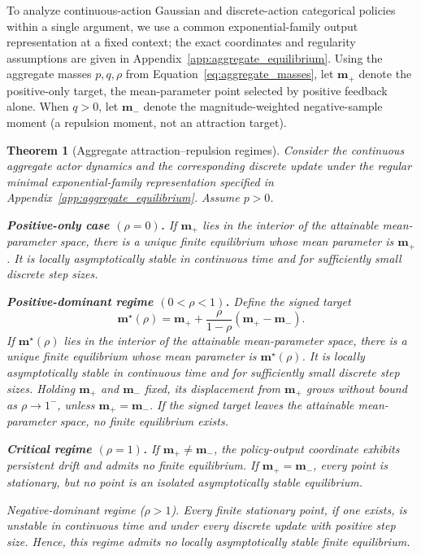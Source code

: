\documentclass{article}
\theoremstyle{plain}
\newtheorem{theorem}{Theorem}[section]
\theoremstyle{definition}
\theoremstyle{remark}
\begin{document}
To analyze continuous-action Gaussian and discrete-action categorical
policies within a single argument, we use a common exponential-family
output representation at a fixed context; the exact coordinates and
regularity assumptions are given in
Appendix~\ref{app:aggregate_equilibrium}. Using the aggregate masses
\(p,q,\rho\) from Equation~\eqref{eq:aggregate_masses}, let
\(\mathbf m_+\) denote the positive-only target, the mean-parameter point
selected by positive feedback alone. When \(q>0\), let \(\mathbf m_-\)
denote the magnitude-weighted negative-sample moment (a repulsion moment,
not an attraction target).

\begin{theorem}[Aggregate attraction--repulsion regimes]
\label{thm:aggregate_equilibria}
Consider the continuous aggregate actor dynamics and the corresponding
discrete update under the regular minimal exponential-family
representation specified in
Appendix~\ref{app:aggregate_equilibrium}. Assume \(p>0\).

\textbf{Positive-only case \((\rho=0)\).}
If \(\mathbf m_+\) lies in the interior of the attainable mean-parameter
space, there is a unique finite equilibrium whose mean parameter is
\(\mathbf m_+\). It is locally asymptotically stable in continuous time
and for sufficiently small discrete step sizes.

\textbf{Positive-dominant regime \((0<\rho<1)\).}
Define the signed target
\begin{equation}
    \mathbf m^\star(\rho)
    =
    \mathbf m_+
    +
    \frac{\rho}{1-\rho}
    \left(
        \mathbf m_+-\mathbf m_-
    \right).
    \label{eq:signed_target_ratio}
\end{equation}
If \(\mathbf m^\star(\rho)\) lies in the interior of the attainable
mean-parameter space, there is a unique finite equilibrium whose mean
parameter is \(\mathbf m^\star(\rho)\). It is locally asymptotically
stable in continuous time and for sufficiently small discrete step
sizes. Holding \(\mathbf m_+\) and \(\mathbf m_-\) fixed, its displacement
from \(\mathbf m_+\) grows without bound as \(\rho\to1^-\), unless
\(\mathbf m_+=\mathbf m_-\). If the signed target leaves the attainable
mean-parameter space, no finite equilibrium exists.

\textbf{Critical regime \((\rho=1)\).}
If \(\mathbf m_+\neq\mathbf m_-\), the policy-output coordinate exhibits
persistent drift and admits no finite equilibrium. If
\(\mathbf m_+=\mathbf m_-\), every point is stationary, but no point is
an isolated asymptotically stable equilibrium.

\textit{Negative-dominant regime (\(\rho>1\)).}
Every finite stationary point, if one exists, is unstable in continuous
time and under every discrete update with positive step size. Hence, this
regime admits no locally asymptotically stable finite equilibrium.
\end{theorem}
\end{document}
